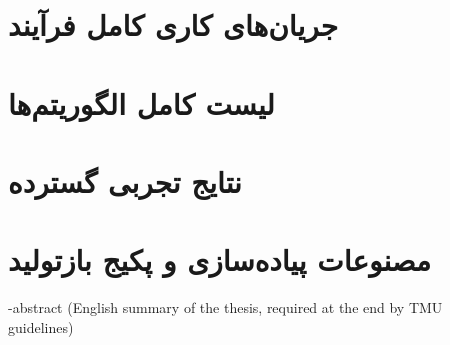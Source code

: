\pagestyle{empty}
{
\onehalfspacing


}

\pagestyle{fancy}
\appendix
\chapter{جریان‌های کاری کامل فرآیند}
\newpage
\chapter{لیست کامل الگوریتم‌ها}
\newpage
\chapter{نتایج تجربی گسترده}
\newpage
\chapter{مصنوعات پیاده‌سازی و پکیج بازتولید}

\newpage

\en-abstract{
(English summary of the thesis, required at the end by TMU guidelines)
}
\latinfirstPage
